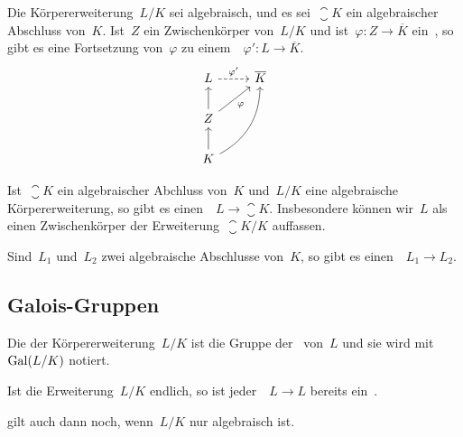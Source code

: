 \begin{theorem}
  Die Körpererweiterung~$L/K$ sei algebraisch, und es sei~$\closure{K}$ ein algebraischer Abschluss von~$K$.
  Ist~$Z$ ein Zwischenkörper von~$L/K$ und ist~$\varphi \colon Z \to \overline{K}$ ein~, so gibt es eine Fortsetzung von~$\varphi$ zu einem~~$\varphi' \colon L \to \overline{K}$.
  \[
    \begin{tikzcd}
      L
      \arrow[dashed]{r}[above]{\varphi'}
      &
      \closure{K}
      \\
      Z
      \arrow{u}
      \arrow{ur}[below right]{\varphi}
      &
      {}
      \\
      K
      \arrow{u}
      \arrow[bend right]{uur}
      &
      {}
    \end{tikzcd}
  \]
\end{theorem}

\begin{corollary}
  Ist~$\closure{K}$ ein algebraischer Abchluss von~$K$ und~$L/K$ eine algebraische Körpererweiterung, so gibt es einen~~$L \to \closure{K}$.
  Insbesondere können wir~$L$ als einen Zwischenkörper der Erweiterung~$\closure{K} / K$ auffassen.
\end{corollary}

\begin{corollary}
  Sind~$L_1$ und~$L_2$ zwei algebraische Abschlusse von~$K$, so gibt es einen~~$L_1 \to L_2$.
\end{corollary}



\subsection{Galois-Gruppen}

\begin{definition}
  Die  der Körpererweiterung~$L/K$ ist die Gruppe der~ von~$L$ und sie wird mit~$\operatorname{Gal}(L/K)$ notiert.
\end{definition}

\begin{proposition}
  \label{homos are autos for finite extension}
  Ist die Erweiterung~$L/K$ endlich, so ist jeder~~$L \to L$ bereits ein~.
\end{proposition}

\begin{remark}
   gilt auch dann noch, wenn~$L/K$ nur algebraisch ist.
\end{remark}

